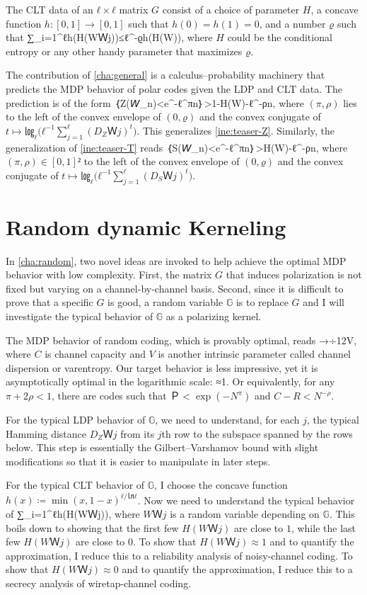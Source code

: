 \documentclass[openany]{amsbook}
\makeatletter
\numberwithin{equation}{chapter}
\numberwithin{figure}{chapter}
\numberwithin{table}{chapter}
\def\bigl@C#1{\bigl#1}					\def\bigr@C#1{\bigr#1}
\def\({\bigl@C(}	\def\){\bigr@C)}	令（{\Bigl(}			令）{\Bigr)}
\def\[#1\]{\begin{equation*}{#1}\end{equation*}}
\theoremstyle{definition}	理dfn:Definition~?s			理exa:Example~?s
\theoremstyle{remark}		理cla:Claim~?s				理rem:Remark~?s
\makeatother
\begin{document}
	The CLT data of an $ℓ×ℓ$ matrix $G$ consist of a choice of parameter $H$, a concave
	function $h:[0,1]→[0,1]$ such that $h(0)=h(1)=0$, and a number $ϱ$ such that
	\[÷1{ℓ}∑_{i=1}^ℓh(H(WＷj))≤ℓ^{-ϱ}h(H(W)),\]
	where $H$ could be the conditional entropy 
	or any other handy parameter that maximizes $ϱ$.
	
	The contribution of \cref{cha:general} is a calculus--probability machinery
	that predicts the MDP behavior of polar codes given the LDP and CLT data.
	The prediction is of the form
	\[𝘗｛Z(𝘞_n)<e^{-ℓ^{πn}}｝>1-H(W)-ℓ^{-ρn},\]
	where $(π,ρ)$ lies to the left of the convex envelope of $(0,ϱ)$
	and the convex conjugate of $t↦㏒_ℓ\(ℓ^{-1}∑_{j=1}^ℓ(D_ZＷj)^t\)$.
	This generalizes \cref{ine:teaser-Z}.
	Similarly, the generalization of \cref{ine:teaser-T} reads
	\[𝘗｛S(𝘞_n)<e^{-ℓ^{πn}}｝>H(W)-ℓ^{-ρn},\]
	where $(π,ρ)∈[0,1]²$ to the left of the convex envelope of $(0,ϱ)$
	and the convex conjugate of $t↦㏒_ℓ\(ℓ^{-1}∑_{j=1}^ℓ(D_SＷj)^t\)$.

\section{Random dynamic Kerneling}

	In \cref{cha:random}, two novel ideas are invoked to help
	achieve the optimal MDP behavior with low complexity.
	First, the matrix $G$ that induces polarization is not fixed
	but varying on a channel-by-channel basis.
	Second, since it is difficult to prove that a specific $G$ is good,
	a random variable $𝔾$ is to replace $G$ and I will investigate
	the typical behavior of $𝔾$ as a polarizing kernel.
	
	The MDP behavior of random coding, which is provably optimal, reads
	\[÷{-㏑Ｐ}{N(C-R)²}→÷1{2V},\]
	where $C$ is channel capacity and $V$ is another
	intrinsic parameter called channel dispersion or varentropy.
	Our target behavior is less impressive,
	yet it is asymptotically optimal in the logarithmic scale:
	\[÷{㏑(-㏑Ｐ)}{㏑(N(C-R)²)}≈1.\]
	Or equivalently, for any $π+2ρ<1$, there are codes
	such that $Ｐ<\exp(-N^π)$ and $C-R<N^{-ρ}$.
	
	For the typical LDP behavior of $𝔾$, we need to understand,
	for each $j$, the typical Hamming distance $D_ZＷj$ from
	its $j$th row to the subspace spanned by the rows below.
	This step is essentially the Gilbert--Varshamov bound with
	slight modifications so that it is easier to manipulate in later steps.
	
	For the typical CLT behavior of $𝔾$, I choose the concave function
	$h(x)≔\min(x,1-x)^{ℓ/㏑ℓ}$.
	Now we need to understand the typical behavior of
	\[÷1{ℓ}∑_{i=1}^ℓh(H(WＷj)),\]
	where $WＷj$ is a random variable depending on $𝔾$.
	This boils down to showing that the first few $H(WＷj)$ are close to $1$,
	while the last few $H(WＷj)$ are close to $0$.
	To show that $H(WＷj)≈1$ and to quantify the approximation,
	I reduce this to a reliability analysis of noisy-channel coding.
	To show that $H(WＷj)≈0$ and to quantify the approximation,
	I reduce this to a secrecy analysis of wiretap-channel coding.
\end{document}
